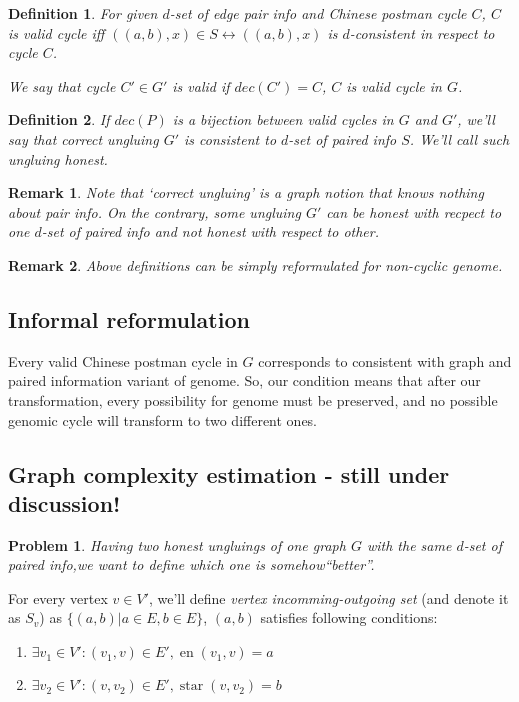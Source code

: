 \documentclass[12pt,a4paper,oneside]{article}
\newtheorem{problem}{Problem}
\newtheorem{definition}{Definition}
\newtheorem{remark}{Remark}
\begin{document}
\begin{definition}

For given $d$-set of edge pair info and Chinese postman cycle $C$, $C$ is \emph{valid} cycle iff $((a, b), x) \in S \leftrightarrow  ((a, b), x)$ is $d$-consistent in respect to cycle $C$.

We say that cycle $C' \in G'$ is \emph{valid} if $dec(C')=C$, $C$ is valid cycle in $G$.
\end{definition}
\begin{definition}  
If $dec(P)$ is a bijection between valid cycles in $G$ and $G'$, we'll say that correct ungluing $G'$ is \emph{consistent} to $d$-set of paired info $S$.
We'll call such ungluing \emph{honest}.
\end{definition}
\begin{remark}
  Note that `correct ungluing' is a graph notion that knows nothing about pair info. On the contrary, some ungluing $G'$ can be honest with recpect to one $d$-set of paired info and not honest with respect to other.
\end{remark}


\begin{remark}
 Above definitions can be simply reformulated for non-cyclic genome.
\end{remark}
\subsection{Informal reformulation}
Every valid Chinese postman cycle in $G$ corresponds to consistent with graph and paired information variant of genome. So, our condition means that after our transformation, every possibility for genome must be preserved, and no possible genomic cycle will transform to two different ones.


\subsection{Graph complexity estimation - still under discussion!}
\begin{problem}
   Having two honest ungluings of one graph $G$ with the same $d$-set of paired info,we want to define which one is somehow``better''.
\end{problem}
  For every vertex $v \in V'$, we'll define \emph{vertex incomming-outgoing set} (and denote it as $S_v$)  as $\{(a, b)| a\in E, b\in E\}$, $(a, b)$ satisfies following conditions:
\begin{enumerate}
 \item $\exists v_1 \in V' : (v_1, v) \in E', \mathop{end_e}(v_1, v) = a$
 \item $\exists v_2 \in V' : (v, v_2) \in E', \mathop{start_e}(v, v_2) = b$
\end{enumerate}
 
\end{document}
